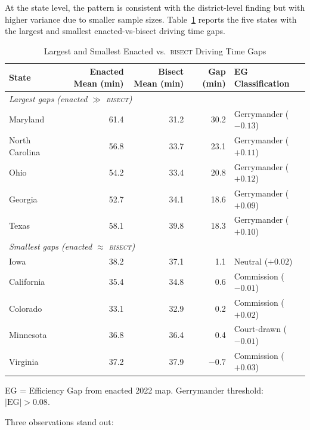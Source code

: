 At the state level, the pattern is consistent with the district-level finding but with
higher variance due to smaller sample sizes. Table~\ref{tab:states} reports the five
states with the largest and smallest enacted-vs-bisect driving time gaps.

\begin{table}[ht]
\centering
\caption{Largest and Smallest Enacted vs.\ \textsc{bisect} Driving Time Gaps}
\label{tab:states}
\begin{tabular}{lrrrl}
\toprule
State & Enacted Mean (min) & Bisect Mean (min) & Gap (min) & EG Classification \\
\midrule
\multicolumn{5}{l}{\textit{Largest gaps (enacted $\gg$ \textsc{bisect})}} \\
Maryland & 61.4 & 31.2 & 30.2 & Gerrymander ($-0.13$) \\
North Carolina & 56.8 & 33.7 & 23.1 & Gerrymander ($+0.11$) \\
Ohio & 54.2 & 33.4 & 20.8 & Gerrymander ($+0.12$) \\
Georgia & 52.7 & 34.1 & 18.6 & Gerrymander ($+0.09$) \\
Texas & 58.1 & 39.8 & 18.3 & Gerrymander ($+0.10$) \\
\midrule
\multicolumn{5}{l}{\textit{Smallest gaps (enacted $\approx$ \textsc{bisect})}} \\
Iowa & 38.2 & 37.1 & 1.1 & Neutral ($+0.02$) \\
California & 35.4 & 34.8 & 0.6 & Commission ($-0.01$) \\
Colorado & 33.1 & 32.9 & 0.2 & Commission ($+0.02$) \\
Minnesota & 36.8 & 36.4 & 0.4 & Court-drawn ($-0.01$) \\
Virginia & 37.2 & 37.9 & $-0.7$ & Commission ($+0.03$) \\
\bottomrule
\end{tabular}
\begin{tablenotes}
\small
\item EG = Efficiency Gap from enacted 2022 map. Gerrymander threshold: $|\text{EG}| > 0.08$.
\end{tablenotes}
\end{table}

Three observations stand out:

